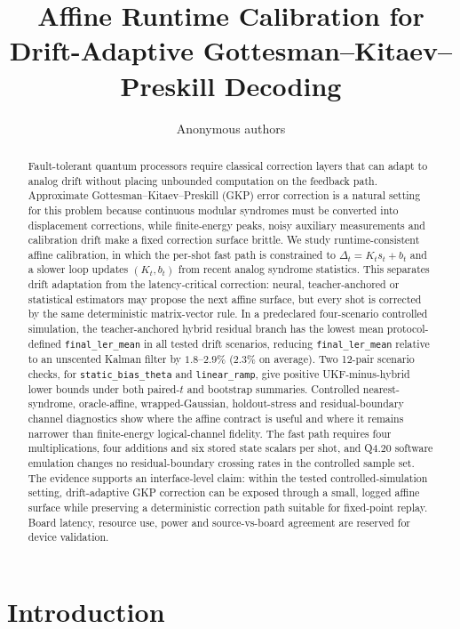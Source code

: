 \documentclass[11pt]{article}
\title{Affine Runtime Calibration for Drift-Adaptive Gottesman--Kitaev--Preskill Decoding}
\author{Anonymous authors}
\date{}
\newcommand{\finalLER}{\texttt{final\_ler\_mean}}
\begin{document}
\maketitle

\begin{abstract}
Fault-tolerant quantum processors require classical correction layers that can
adapt to analog drift without placing unbounded computation on the feedback
path.  Approximate Gottesman--Kitaev--Preskill (GKP) error correction is a
natural setting for this problem because continuous modular syndromes must be
converted into displacement corrections, while finite-energy peaks, noisy
auxiliary measurements and calibration drift make a fixed correction surface
brittle.  We study runtime-consistent affine calibration, in which the
per-shot fast path is constrained to
\(\Delta_t = K_t s_t + b_t\) and a slower loop updates \((K_t,b_t)\) from recent
analog syndrome statistics.  This separates drift adaptation from the
latency-critical correction: neural, teacher-anchored or statistical estimators
may propose the next affine surface, but every shot is corrected by the same
deterministic matrix-vector rule.  In a predeclared four-scenario controlled
simulation, the teacher-anchored hybrid residual branch has the lowest mean
protocol-defined \finalLER{} in all tested drift scenarios, reducing
\finalLER{} relative to an unscented Kalman filter by \(1.8\)--\(2.9\%\)
(\(2.3\%\) on average).  Two 12-pair scenario checks, for
\texttt{static\_bias\_theta} and \texttt{linear\_ramp}, give positive
UKF-minus-hybrid lower bounds under both paired-\(t\) and bootstrap summaries.
Controlled nearest-syndrome, oracle-affine, wrapped-Gaussian, holdout-stress
and residual-boundary channel diagnostics show where the affine contract is
useful and where it remains narrower than finite-energy logical-channel
fidelity.  The fast path requires four multiplications, four additions and six
stored state scalars per shot, and Q4.20 software emulation changes no
residual-boundary crossing rates in the controlled sample set.  The evidence
supports an interface-level claim: within the tested controlled-simulation
setting, drift-adaptive GKP correction can be exposed through a small, logged
affine surface while preserving a deterministic correction path suitable for
fixed-point replay.  Board latency, resource use, power and source-vs-board
agreement are reserved for device validation.
\end{abstract}

\section{Introduction}
\end{document}
